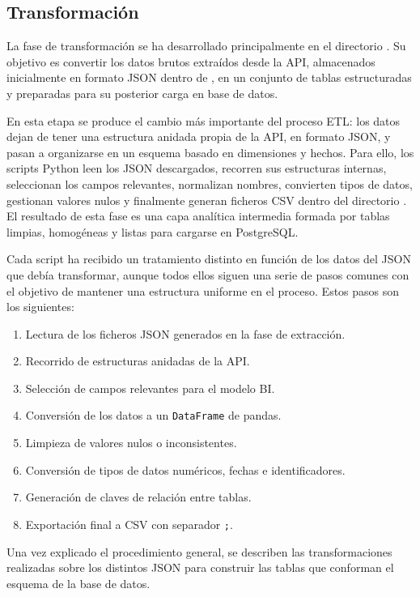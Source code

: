 \subsection{Transformación}

La fase de transformación se ha desarrollado principalmente en el directorio . Su objetivo es convertir los datos brutos extraídos desde la API, almacenados inicialmente en formato JSON dentro de , en un conjunto de tablas estructuradas y preparadas para su posterior carga en base de datos.

En esta etapa se produce el cambio más importante del proceso ETL: los datos dejan de tener una estructura anidada propia de la API, en formato JSON, y pasan a organizarse en un esquema basado en dimensiones y hechos. Para ello, los scripts Python leen los JSON descargados, recorren sus estructuras internas, seleccionan los campos relevantes, normalizan nombres, convierten tipos de datos, gestionan valores nulos y finalmente generan ficheros CSV dentro del directorio . El resultado de esta fase es una capa analítica intermedia formada por tablas limpias, homogéneas y listas para cargarse en PostgreSQL.

Cada script ha recibido un tratamiento distinto en función de los datos del JSON que debía transformar, aunque todos ellos siguen una serie de pasos comunes con el objetivo de mantener una estructura uniforme en el proceso. Estos pasos son los siguientes:

\begin{enumerate}
    \item Lectura de los ficheros JSON generados en la fase de extracción.
    \item Recorrido de estructuras anidadas de la API.
    \item Selección de campos relevantes para el modelo BI.
    \item Conversión de los datos a un \texttt{DataFrame} de pandas.
    \item Limpieza de valores nulos o inconsistentes.
    \item Conversión de tipos de datos numéricos, fechas e identificadores.
    \item Generación de claves de relación entre tablas.
    \item Exportación final a CSV con separador \texttt{;}.
\end{enumerate}

Una vez explicado el procedimiento general, se describen las transformaciones realizadas sobre los distintos JSON para construir las tablas que conforman el esquema de la base de datos.

